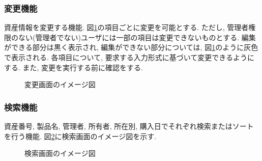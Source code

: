 \documentclass[11ptm]{jsarticle}
\begin{document}
\subsubsection{変更機能}
\label{subsec:変更機能}
資産情報を変更する機能. 図\ref{fig:変更画面のイメージ図}の項目ごとに変更を可能とする. ただし, 管理者権限のない(管理者でない)ユーザには一部の項目は変更できないものとする. 編集ができる部分は黒く表示され, 編集ができない部分については, 図\ref{fig:変更画面のイメージ図}のように灰色で表示される. 各項目について, 要求する入力形式に基づいて変更できるようにする. また, 変更を実行する前に確認をする.
\begin{figure}[h]
  \centering
  \caption{\label{fig:変更画面のイメージ図}変更画面のイメージ図}
\end{figure}

\clearpage
\subsubsection{検索機能}
\label{subsec:検索機能}
資産番号, 製品名, 管理者, 所有者, 所在別, 購入日でそれぞれ検索またはソートを行う機能. 図\ref{fig:検索画面のイメージ図}に検索画面のイメージ図を示す. 
\begin{figure}[h]
  \centering
  \caption{\label{fig:検索画面のイメージ図}検索画面のイメージ図}
\end{figure}
\end{document}
